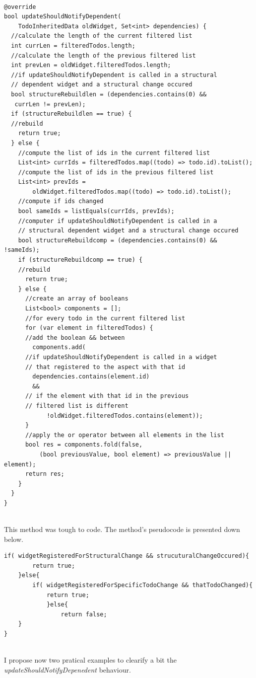 \begin{code}
\mbox{}
\label{code:2.46}
\begin{verbatim}

@override
bool updateShouldNotifyDependent(
    TodoInheritedData oldWidget, Set<int> dependencies) {
  //calculate the length of the current filtered list  
  int currLen = filteredTodos.length;
  //calculate the length of the previous filtered list  
  int prevLen = oldWidget.filteredTodos.length;
  //if updateShouldNotifyDependent is called in a structural
  // dependent widget and a structural change occured
  bool structureRebuildlen = (dependencies.contains(0) &&
   currLen != prevLen);
  if (structureRebuildlen == true) {
  //rebuild
    return true;
  } else {
    //compute the list of ids in the current filtered list
    List<int> currIds = filteredTodos.map((todo) => todo.id).toList();
    //compute the list of ids in the previous filtered list
    List<int> prevIds =
        oldWidget.filteredTodos.map((todo) => todo.id).toList();
    //compute if ids changed
    bool sameIds = listEquals(currIds, prevIds);
    //computer if updateShouldNotifyDependent is called in a 
    // structural dependent widget and a structural change occured
    bool structureRebuildcomp = (dependencies.contains(0) && !sameIds);
    if (structureRebuildcomp == true) {
    //rebuild
      return true;
    } else {
      //create an array of booleans
      List<bool> components = [];
      //for every todo in the current filtered list
      for (var element in filteredTodos) {
      //add the boolean && between
        components.add(
      //if updateShouldNotifyDependent is called in a widget 
      // that registered to the aspect with that id        
        dependencies.contains(element.id) 
        &&
      // if the element with that id in the previous 
      // filtered list is different
            !oldWidget.filteredTodos.contains(element));
      }
      //apply the or operator between all elements in the list
      bool res = components.fold(false,
          (bool previousValue, bool element) => previousValue || element);
      return res;
    }
  }
}
\end{verbatim}
\end{code}
\mbox{}\\
This method was tough to code. The method's pseudocode is presented down below. 
\mbox{}\\
\begin{code}
\mbox{}
\label{code:2.48}
\begin{verbatim}
if( widgetRegisteredForStructuralChange && strucuturalChangeOccured){
        return true;
    }else{
        if( widgetRegisteredForSpecificTodoChange && thatTodoChanged){
            return true;
            }else{
                return false;
    }
}
\end{verbatim}
\end{code}
\mbox{}\\
I propose now two pratical examples to clearify a bit the  \textit{updateShouldNotifyDepenedent} behaviour.
